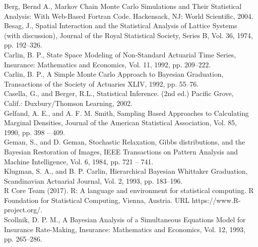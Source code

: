 \documentclass[11pt, oneside]{article}
\begin{document}
\begin{thebibliography}{9}
 Berg, Bernd A., Markov Chain Monte Carlo Simulations and Their Statistical Analysis: With Web-Based Fortran Code. Hackensack, NJ: World Scientific, 2004.\\
 Besag, J., Spatial Interaction and the Statistical Analysis of Lattice Systems (with discussion), Journal of the Royal Statistical Society, Series B, Vol. 36, 1974, pp. 192--326.\\
 Carlin, B. P., State Space Modeling of Non-Standard Actuarial Time Series, Insurance: Mathematics and Economics, Vol. 11, 1992, pp. 209--222.\\
 Carlin, B. P., A Simple Monte Carlo Approach to Bayesian Graduation, Transactions of the Society of Actuaries XLIV, 1992, pp. 55--76.\\
 Casella, G., and Berger, R.L., Statistical Inference. (2nd ed.) Pacific Grove, Calif.: Duxbury/Thomson Learning, 2002.\\
 Gelfand, A. E., and A. F. M. Smith, Sampling Based Approaches to Calculating Marginal Densities, Journal of the American Statistical Association, Vol. 85, 1990, pp. 398 -- 409.\\
 Geman, S., and D. Geman, Stochastic Relaxation, Gibbs distributions, and the Bayesian Restoration of Images, IEEE Transactions on Pattern Analysis and Machine Intelligence, Vol. 6, 1984, pp. 721 -- 741.\\
 Klugman, S. A., and B. P. Carlin, Hierarchical Bayesian Whittaker Graduation, Scandinavian Actuarial Journal, Vol. 2, 1993, pp. 183--196.\\
 R Core Team (2017). R: A language and environment for statistical computing. R Foundation for Statistical Computing, Vienna, Austria. URL https://www.R-project.org/.\\
 Scollnik, D. P. M., A Bayesian Analysis of a Simultaneous Equations Model for Insurance Rate-Making, Insurance: Mathematics and Economics, Vol. 12, 1993, pp. 265--286.\\
\end{thebibliography}
\end{document}
